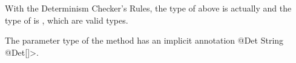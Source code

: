 With the Determinism Checker's Rules, the type of  above is actually
 and the type of  is , which are valid types.

The parameter type of the  method has an implicit annotation
\<@Det String @Det[]>.

